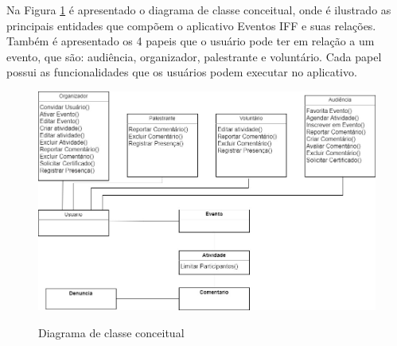 Na Figura \ref{fig:digrama-classe} é apresentado o diagrama de classe conceitual, onde é ilustrado as principais entidades que compõem o aplicativo Eventos IFF e suas relações. Também é apresentado os 4 papeis que o usuário pode ter em relação a um evento, que são: audiência, organizador, palestrante e voluntário. Cada papel possui as funcionalidades que os usuários podem executar no aplicativo.

\begin{figure}[H]
    \centering
    \caption{Diagrama de classe conceitual}
    \includegraphics[scale=0.5]{figuras/diagrama-classe-conceitual.jpg}
    \label{fig:digrama-classe}
\end{figure}